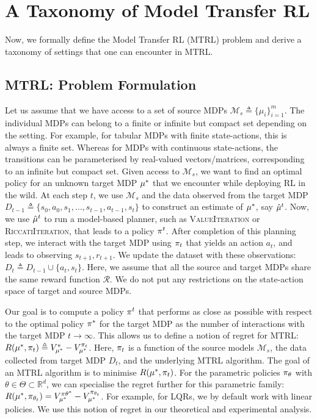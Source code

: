 \section{A Taxonomy of Model Transfer RL}\label{sec:trl}
Now, we formally define the Model Transfer RL (MTRL) problem and derive a taxonomy of settings that one can encounter in MTRL.

\subsection{MTRL: Problem Formulation} 
Let us assume that we have access to a set of source MDPs $\mathcal{M}_s \triangleq \{\mu_i\}_{i=1}^m$. The individual MDPs can belong to a finite or infinite but compact set depending on the setting. For example, for tabular MDPs with finite state-actions, this is always a finite set. Whereas for MDPs with continuous state-actions, the transitions can be parameterised by real-valued vectors/matrices, corresponding to an infinite but compact set.
Given access to $\mathcal{M}_s$, we want to find an optimal policy for an unknown target MDP $\mu^*$ that we encounter while deploying RL in the wild.
At each step $t$, we use $\mathcal{M}_s$ and the data observed from the target MDP $D_{t-1} \triangleq \{ s_0, a_0, s_1, \ldots, s_{t-1}, a_{t-1}, s_t\}$ to construct an estimate of $\mu^*$, say $\hat{\mu}^t$. Now, we use $\hat{\mu}^t$ to run a model-based planner, such as \textsc{ValueIteration} or \textsc{RiccatiIteration}, that leads to a policy $\pi^t$. After completion of this planning step, we interact with the target MDP using $\pi_t$ that yields an action $a_t$, and leads to observing $s_{t+1}, r_{t+1}$. We update the dataset with these observations: $D_t \triangleq D_{t-1} \cup \{a_{t}, s_t\}$. Here, we assume that all the source and target MDPs share the same reward function $\mathcal{R}$. We do not put any restrictions on the state-action space of target and source MDPs. %

Our goal is to compute a policy ${\pi}^t$ that performs as close as possible with respect to the optimal policy $\pi^*$ for the target MDP as the number of interactions with the target MDP $t\rightarrow \infty$.
This allows us to define a notion of regret for MTRL: $R(\mu^{*}, \pi_t) \triangleq V_{\mu^{*}}^{*}-V_{\mu^{*}}^{\pi_t}$. Here, $\pi_t$ is a function of the source models $\mathcal{M}_s$, the data collected from target MDP $D_t$, and the underlying MTRL algorithm.
The goal of an MTRL algorithm is to minimise $R(\mu^{*}, \pi_t)$.
For the parametric policies $\pi_{\theta}$ with $\theta \in \Theta \subset \mathbb{R}^d$, we can specialise the regret further for this parametric family: $R(\mu^{*}, \pi_{\theta_t}) = V_{\mu^{*}}^{\pi{\theta^*}}-V_{\mu^{*}}^{\pi_{\theta_t}}$. For example, for LQRs, we by default work with linear policies. We use this notion of regret in our theoretical and experimental analysis.

